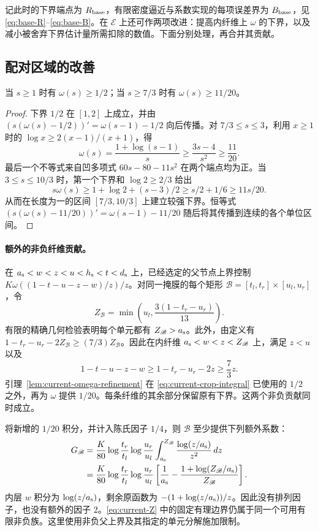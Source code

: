 记此时的下界端点为 $R_{\rm base}$，有限密度逼近与系数实现的每项误差界为 $B_{\rm base}$，见 \eqref{eq:base-R}--\eqref{eq:base-B}。在 $\mathscr E$ 上还可作两项改进：提高内纤维上 $\omega$ 的下界，以及减小被舍弃下界估计量所需扣除的数值。下面分别处理，再合并其贡献。

\subsection{配对区域的改善}
\label{sec:current-refinement}

\begin{lemma}
\label{lem:current-omega-refinement}
当 $s\ge1$ 时有 $\omega(s)\ge1/2$；当 $s\ge7/3$ 时有 $\omega(s)\ge11/20$。
\end{lemma}

\begin{proof}
下界 $1/2$ 在 $[1,2]$ 上成立，并由 $(s(\omega(s)-1/2))'=\omega(s-1)-1/2$ 向后传播。对 $7/3\le s\le3$，利用 $x\ge1$ 时的 $\log x\ge2(x-1)/(x+1)$，得
\[
 \omega(s)=\frac{1+\log(s-1)}s\ge\frac{3s-4}{s^2}\ge\frac{11}{20}.
\]
最后一个不等式来自凹多项式 $60s-80-11s^2$ 在两个端点均为正。当 $3\le s\le10/3$ 时，第一个下界和 $\log2\ge2/3$ 给出
\[
 s\omega(s)\ge1+\log2+(s-3)/2\ge s/2+1/6\ge11s/20.
\]
从而在长度为一的区间 $[7/3,10/3]$ 上建立较强下界。恒等式 $(s(\omega(s)-11/20))'=\omega(s-1)-11/20$ 随后将其传播到连续的各个单位区间。
\end{proof}

\paragraph{额外的非负纤维贡献。}
在 ${a_{\rm s}}<w<z<u<{h_{\rm s}}<t<{d_{\rm s}}$ 上，已经选定的父节点上界控制 $K\omega((1-t-u-z-w)/z)/z$。对同一掩膜的每个矩形 $\mathscr B=[t_l,t_r]\times[u_l,u_r]$，令
\begin{equation}
 Z_{\mathscr B}=\min\left(u_l,\frac{3(1-t_r-u_r)}{13}\right).
 \label{eq:current-Z}
\end{equation}
有限的精确几何检验表明每个单元都有 $Z_{\mathscr B}>{a_{\rm s}}$。此外，由定义有 $1-t_r-u_r-2Z_{\mathscr B}\ge(7/3)Z_{\mathscr B}$。因此在内纤维 ${a_{\rm s}}<w<z<Z_{\mathscr B}$ 上，满足 $z<u$ 以及
\[
 1-t-u-z-w\ge1-t_r-u_r-2z\ge\frac73z.
\]
引理~\ref{lem:current-omega-refinement} 在 \eqref{eq:current-crop-integral} 已使用的 $1/2$ 之外，再为 $\omega$ 提供 $1/20$。每条纤维的其余部分保留原有下界。这两个非负贡献同时成立。

将新增的 $1/20$ 积分，并计入陈氏因子 $1/4$，则 $\mathscr B$ 至少提供下列额外系数：
\begin{align}
 G_{\mathscr B}
 &=\frac{K}{80}
   \log\frac{t_r}{t_l}\log\frac{u_r}{u_l}
      \int_{a_{\rm s}}^{Z_{\mathscr B}}\frac{\log(z/{a_{\rm s}})}{z^2}\,dz \notag\\
 &=\frac{K}{80}
   \log\frac{t_r}{t_l}\log\frac{u_r}{u_l}
   \left[\frac1{a_{\rm s}}-\frac{1+\log(Z_{\mathscr B}/{a_{\rm s}})}{Z_{\mathscr B}}\right].
 \label{eq:current-extra-fibre}
\end{align}
内层 $w$ 积分为 $\log(z/{a_{\rm s}})$，剩余原函数为 $-(1+\log(z/{a_{\rm s}}))/z$。因此没有排列因子，也没有额外的因子 $2$。\eqref{eq:current-Z} 中的固定有理边界仍属于同一个可用有限非负族。这里使用非负父上界及其指定的单元分解施加限制。

